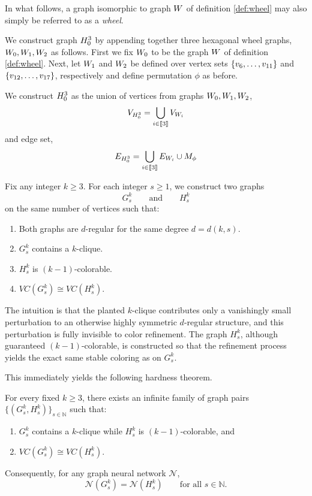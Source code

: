 In what follows, a graph isomorphic to graph $W$ of definition \ref{def:wheel} may also simply be referred to as a \emph{wheel}. 

We construct graph $H_0^3$ by appending together three hexagonal wheel graphs, $W_0, W_1, W_2$ as follows. First we fix $W_0$ to be the graph $W$ of definition \ref{def:wheel}. Next, let $W_1$ and $W_2$ be defined over vertex sets 
$\{v_6,\dots,v_{11}\}$ and $\{v_{12},\dots,v_{17}\}$, respectively and define permutation $\phi$ as before.

We construct $H_0^3$ as the union of vertices from graphs $W_0, W_1, W_2$, 
$$V_{H_0^3} = \bigcup_{i \in \llbracket 3 \rrbracket} V_{W_i}$$
and edge set, 
$$E_{H_0^3} = \bigcup_{i \in \llbracket 3 \rrbracket} E_{W_i}  \cup M_\phi$$


Fix any integer $k \ge 3$. For each integer $s \ge 1$, we construct two graphs
\[
G_s^k \qquad\text{and}\qquad H_s^k
\]
on the same number of vertices such that:
\begin{enumerate}
    \item Both graphs are $d$-regular for the same degree $d = d(k,s)$.
    \item $G_s^k$ contains a $k$-clique.
    \item $H_s^k$ is $(k-1)$-colorable.
    \item $VC(G_s^k) \cong VC(H_s^k)$.
\end{enumerate}

The intuition is that the planted $k$-clique contributes only a vanishingly small perturbation to an otherwise highly symmetric $d$-regular structure, and this perturbation is fully invisible to color refinement. The graph $H_s^k$, although guaranteed $(k-1)$-colorable, is constructed so that the refinement process yields the exact same stable coloring as on $G_s^k$.

This immediately yields the following hardness theorem.

\begin{theorem}
\label{thm:gnn-hard}
For every fixed $k \ge 3$, there exists an infinite family of graph pairs
$\{(G_s^k, H_s^k)\}_{s \in \mathbb{N}}$
such that:
\begin{enumerate}
    \item $G_s^k$ contains a $k$-clique while $H_s^k$ is $(k-1)$-colorable, and
    \item $VC(G_s^k) \cong VC(H_s^k)$.
\end{enumerate}
Consequently, for any graph neural network $\mathcal{N}$,
\[
\mathcal{N}(G_s^k) = \mathcal{N}(H_s^k) \qquad \text{for all } s \in \mathbb{N}.
\]
\end{theorem}

